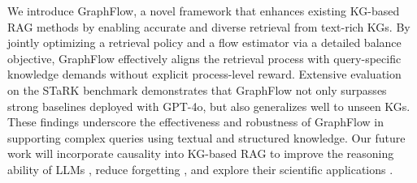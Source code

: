 We introduce GraphFlow, a novel framework that enhances existing KG-based RAG methods by enabling accurate and diverse retrieval from text-rich KGs.
By jointly optimizing a retrieval policy and a flow estimator via a detailed balance objective, GraphFlow effectively aligns the retrieval process with query-specific knowledge demands without explicit process-level reward.
Extensive evaluation on the STaRK benchmark demonstrates that GraphFlow not only surpasses strong baselines deployed with GPT-4o, but also generalizes well to unseen KGs.
These findings underscore the effectiveness and robustness of GraphFlow in supporting complex queries using textual and structured knowledge.
Our future work will incorporate causality into KG-based RAG to improve the reasoning ability of LLMs \cite{liu2024discovery,chen2022learning,yu2023mind}, reduce forgetting \cite{linover, lin2023eliminating}, and explore their scientific applications \cite{yang2024moose}.